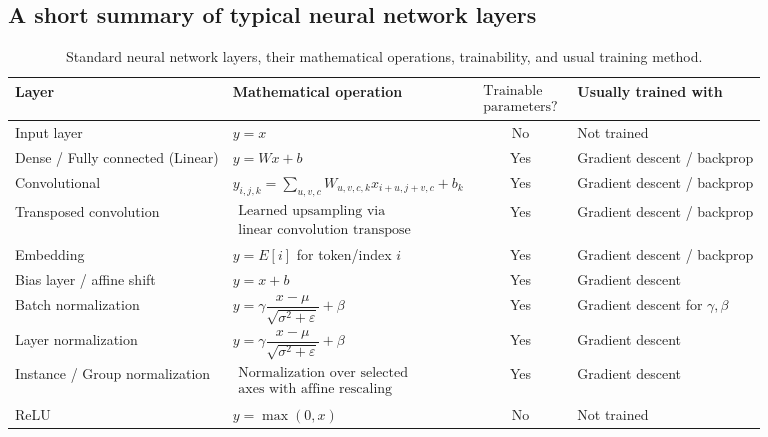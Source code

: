 \documentclass[aps, prb, superscriptaddress, longbibliography]{revtex4-2}
\renewcommand{\epsilon}{\varepsilon}
\numberwithin{equation}{section}
\begin{document}
    \subsection{A short summary of typical neural network layers}
    
    \begin{table}[htbp]
\centering
\caption{Standard neural network layers, their mathematical operations, trainability, and usual training method.}
\label{tab:nn_layers}
\begin{tabular}{|l|p{7.2cm}|c|p{3.2cm}|}
\hline
\textbf{Layer} & \textbf{Mathematical operation} & $\begin{array}{c}
\text{Trainable}\\
\text{parameters?}\end{array}$ & \textbf{Usually trained with} \\
\hline
Input layer & $y = x$ & No & Not trained \\
\hline
Dense / Fully connected (Linear) & $y = Wx + b$ & Yes & Gradient descent / backprop \\
\hline
Convolutional & $y_{i,j,k} = \sum_{u,v,c} W_{u,v,c,k} x_{i+u,j+v,c} + b_k$ & Yes & Gradient descent / backprop \\
\hline
Transposed convolution & $\begin{array}{c}
\text{Learned upsampling via}\\
\text{linear convolution transpose} \end{array}$ & Yes & Gradient descent / backprop \\
\hline
Embedding & $y = E[i]$ for token/index $i$ & Yes & Gradient descent / backprop \\
\hline
Bias layer / affine shift & $y = x + b$ & Yes & Gradient descent \\
\hline
Batch normalization & $y = \gamma \dfrac{x-\mu}{\sqrt{\sigma^2+\epsilon}} + \beta$ & Yes & Gradient descent for $\gamma,\beta$ \\
\hline
Layer normalization & $y = \gamma \dfrac{x-\mu}{\sqrt{\sigma^2+\epsilon}} + \beta$ & Yes & Gradient descent \\
\hline
Instance / Group normalization & $\begin{array}{c}
\text{Normalization over selected}\\
\text{axes with affine rescaling}\end{array}$ & Yes & Gradient descent \\
\hline
ReLU & $y = \max(0,x)$ & No & Not trained \\

\end{tabular}
\end{table}
\end{document}
